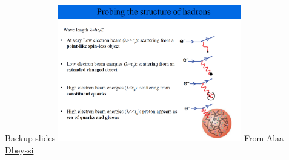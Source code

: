 \documentclass[aspectratio=169]{beamer}
\begin{document}
\begin{frame}{Backup slides}
\centering
\includegraphics[width=0.6\textwidth]{backup/scale_walkdown.png}
From \href{https://indico.gsi.de/event/6430/sessions/4600/attachments/21407/26971/AD_NucleonStructure2.pdf}{Alaa Dbeyssi}
\end{frame}
\end{document}
